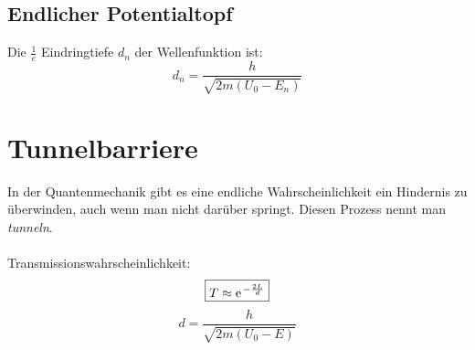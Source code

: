 \subsection{Endlicher Potentialtopf}
Die $\frac{1}{e}$ Eindringtiefe $d_n$ der Wellenfunktion ist:\\
\[\boxed{
	d_n = \frac{h}{\sqrt{2m(U_0 - E_n)}}
}\]

\section{Tunnelbarriere}
In der Quantenmechanik gibt es eine endliche Wahrscheinlichkeit ein Hindernis zu überwinden, auch wenn man nicht darüber springt. Diesen Prozess nennt man \textit{tunneln}.\\
\\
Transmissionswahrscheinlichkeit:
\[\boxed{
	T \approx \mathrm{e\;\!}^{-\frac{2L}{d}}
}\]
\[\boxed{
	d = \frac{h}{\sqrt{2m(U_0-E)}}
}\]